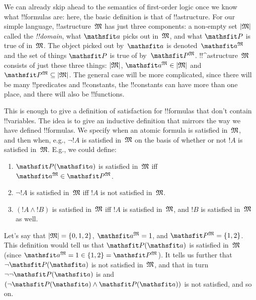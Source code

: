 \documentclass[../../../include/open-logic-section]{subfiles}
\begin{document}


We can already skip ahead to the semantics of first-order logic once
we know what !!{formula}s are: here, the basic definition is that of 
!!a{structure}. For our simple language, !!a{structure}~$\Struct M$ has
just three components: a non-empty set $\Domain{M}$ called the
\emph{!!{domain}}, what $\Obj a$ picks out in~$\Struct M$, and what
$\Obj P$ is true of in~$\Struct M$.  The object picked out by~$\Obj a$
is denoted~$\Assign{\Obj a}{M}$ and the set of things $\Obj P$ is true
of by~$\Assign{\Obj P}{M}$. !!^a{structure}~$\Struct{M}$ consists of
just these three things: $\Domain{M}$, $\Assign{\Obj a}{M} \in
\Domain{M}$ and $\Assign{\Obj P}{M} \subseteq \Domain{M}$. The general
case will be more complicated, since there will be many !!{predicate}s
and !!{constant}s, the !!{constant}s can have more than one place, and
there will also be !!{function}s.

This is enough to give a definition of satisfaction for !!{formula}s
that don't contain !!{variable}s.  The idea is to give an inductive
definition that mirrors the way we have defined !!{formula}s. We
specify when an atomic formula is satisfied in~$\Struct{M}$, and then
when, e.g., $\lnot !A$ is satisfied in~$\Struct{M}$ on the basis of
whether or not $!A$ is satisfied in~$\Struct{M}$. E.g., we could
define:
\begin{enumerate}
  \item $\Atom{\Obj P}{\Obj a}$ is satisfied in~$\Struct{M}$ iff
  $\Assign{\Obj a}{M} \in \Assign{\Obj P}{M}$.
  \item $\lnot !A$ is satisfied in~$\Struct{M}$ iff $!A$ is not
  satisfied in~$\Struct{M}$.
  \item $(!A \land !B)$ is satisfied in~$\Struct{M}$ iff $!A$ is
  satisfied in~$\Struct{M}$, and $!B$ is satisfied in~$\Struct{M}$ as
  well.
\end{enumerate}
Let's say that $\Domain{M} = \{0, 1, 2\}$, $\Assign{\Obj a}{M} = 1$,
and $\Assign{\Obj P}{M} = \{1, 2\}$. This definition would tell us
that $\Atom{\Obj P}{\Obj a}$ is satisfied in~$\Struct{M}$ (since
$\Assign{\Obj a}{M} =  1 \in \{1,2\} = \Assign{\Obj P}{M}$). It tells
us further that $\lnot \Atom{\Obj P}{\Obj a}$ is not satisfied
in~$\Struct{M}$, and that in turn $\lnot\lnot \Atom{\Obj P}{\Obj
a}$ is and $(\lnot \Atom{\Obj P}{\Obj a} \land \Atom{\Obj P}{\Obj a})$
is not satisfied, and so on.
\end{document}
